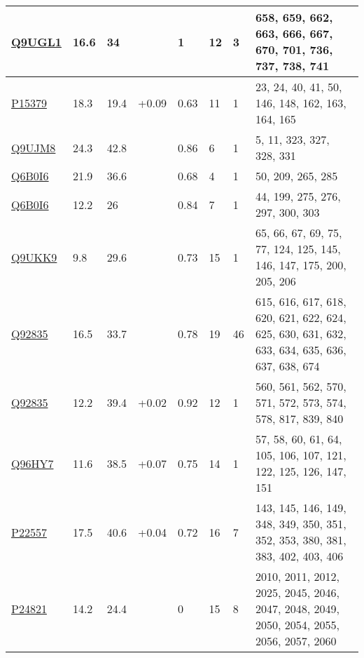 {\begin{landscape}
\begin{longtable}{|M{22mm}|M{17mm}|M{18mm}|M{13mm}|M{13mm}|M{10mm}|M{10mm}|M{96mm}|}
\href{https://www.uniprot.org/uniprotkb/Q9UGL1/entry}{Q9UGL1}     & 16.6 & 34       &  & 1    & 12          & 3          & 658, 659, 662, 663, 666, 667, 670, 701, 736, 737, 738, 741                                         \\ \hline
\href{https://www.uniprot.org/uniprotkb/P15379/entry}{P15379}     & 18.3 & 19.4     & +0.09  & 0.63 & 11          & 1          & 23, 24, 40, 41, 50, 146, 148, 162, 163, 164, 165                                                   \\ \hline
\href{https://www.uniprot.org/uniprotkb/Q9UJM8/entry}{Q9UJM8}     & 24.3 & 42.8     &  & 0.86 & 6           & 1          & 5, 11, 323, 327, 328, 331                                                                          \\ \hline
\href{https://www.uniprot.org/uniprotkb/Q6B0I6/entry}{Q6B0I6}     & 21.9 & 36.6     &  & 0.68 & 4           & 1          & 50, 209, 265, 285                                                                                  \\ \hline
\href{https://www.uniprot.org/uniprotkb/Q6B0I6/entry}{Q6B0I6}     & 12.2 & 26       &  & 0.84 & 7           & 1          & 44, 199, 275, 276, 297, 300, 303                                                                   \\ \hline
\href{https://www.uniprot.org/uniprotkb/Q9UKK9/entry}{Q9UKK9}     & 9.8  & 29.6     &  & 0.73 & 15          & 1          & 65, 66, 67, 69, 75, 77, 124, 125, 145, 146, 147, 175, 200, 205, 206                                \\ \hline
\href{https://www.uniprot.org/uniprotkb/Q92835/entry}{Q92835}     & 16.5 & 33.7     &  & 0.78 & 19          & 46         & 615, 616, 617, 618, 620, 621, 622, 624, 625, 630, 631, 632, 633, 634, 635, 636, 637, 638, 674      \\ \hline
\href{https://www.uniprot.org/uniprotkb/Q92835/entry}{Q92835}     & 12.2 & 39.4     & +0.02  & 0.92 & 12          & 1          & 560, 561, 562, 570, 571, 572, 573, 574, 578, 817, 839, 840                                         \\ \hline
\href{https://www.uniprot.org/uniprotkb/Q96HY7/entry}{Q96HY7}     & 11.6 & 38.5     & +0.07  & 0.75 & 14          & 1          & 57, 58, 60, 61, 64, 105, 106, 107, 121, 122, 125, 126, 147, 151                                    \\ \hline
\href{https://www.uniprot.org/uniprotkb/P22557/entry}{P22557}     & 17.5 & 40.6     & +0.04  & 0.72 & 16          & 7          & 143, 145, 146, 149, 348, 349, 350, 351, 352, 353, 380, 381, 383, 402, 403, 406                     \\ \hline
\href{https://www.uniprot.org/uniprotkb/P24821/entry}{P24821}     & 14.2 & 24.4     &  & 0    & 15          & 8          & 2010, 2011, 2012, 2025, 2045, 2046, 2047, 2048, 2049, 2050, 2054, 2055, 2056, 2057, 2060           \\ \hline


\end{longtable}
\end{landscape}}
